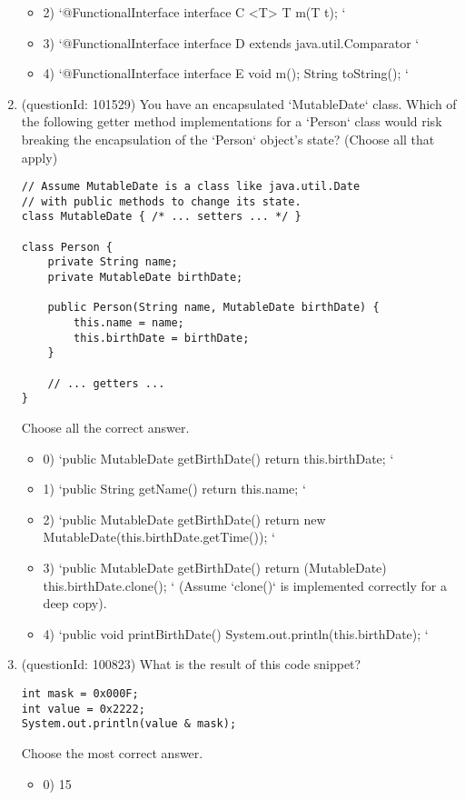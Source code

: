 \documentclass[12pt]{article}
\begin{document}
\begin{enumerate}[label=(\arabic*)]
\begin{itemize}
\item 2) `@FunctionalInterface interface C { <T> T m(T t); }`

\item 3) `@FunctionalInterface interface D extends java.util.Comparator { }`

\item 4) `@FunctionalInterface interface E { void m(); String toString(); }`

\end{itemize}
\item (questionId: 101529) You have an encapsulated `MutableDate` class. Which of the following getter method implementations for a `Person` class would risk breaking the encapsulation of the `Person` object's state? (Choose all that apply)\n\begin{verbatim}
// Assume MutableDate is a class like java.util.Date
// with public methods to change its state.
class MutableDate { /* ... setters ... */ }

class Person {
    private String name;
    private MutableDate birthDate;

    public Person(String name, MutableDate birthDate) {
        this.name = name;
        this.birthDate = birthDate;
    }

    // ... getters ...
}
\end{verbatim}
Choose all the correct answer.\begin{itemize}
\item 0) `public MutableDate getBirthDate() { return this.birthDate; }`

\item 1) `public String getName() { return this.name; }`

\item 2) `public MutableDate getBirthDate() { return new MutableDate(this.birthDate.getTime()); }`

\item 3) `public MutableDate getBirthDate() { return (MutableDate) this.birthDate.clone(); }` (Assume `clone()` is implemented correctly for a deep copy).

\item 4) `public void printBirthDate() { System.out.println(this.birthDate); }`

\end{itemize}
\item (questionId: 100823) What is the result of this code snippet?\n\begin{verbatim}
int mask = 0x000F;
int value = 0x2222;
System.out.println(value & mask);
\end{verbatim}
Choose the most correct answer. 
\begin{itemize}
\item 0) 15


\end{itemize}
\end{enumerate}
\end{document}
